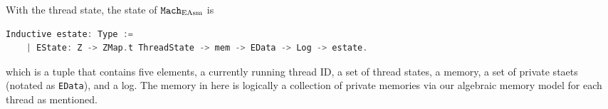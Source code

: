 With the thread state,  the state of ${\mathrm{\texttt{Mach}}}_{\mathrm{EAsm}}$ is
\begin{lstlisting}[language=C]
  Inductive estate: Type :=
    | EState: Z -> ZMap.t ThreadState -> mem -> EData -> Log -> estate.
\end{lstlisting}
which is a tuple that contains five elements,
a currently running thread ID, a set of thread states, a memory, a set of private staets (notated as \lstinline$EData$), and a log. 
The memory in here is logically a collection of private memories via our algebraic memory model for each thread as mentioned. 

%


